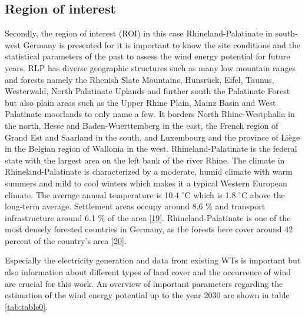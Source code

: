 \documentclass[a4paper,11pt]{article}
\begin{document}
\hypertarget{region-of-interest}{%
\subsection{Region of interest}\label{region-of-interest}}

Secondly, the region of interest (ROI) in this case Rhineland-Palatinate in south-west Germany is presented for it is important to know the site conditions and the statistical parameters of the past to assess the wind energy potential for future years. RLP has diverse geographic structures such as many low mountain ranges and forests namely the Rhenish Slate Mountains, Hunsrück, Eifel, Taunus, Westerwald, North Palatinate Uplands and further south the Palatinate Forest but also plain areas such as the Upper Rhine Plain, Mainz Basin and West Palatinate moorlands to only name a few. It borders North Rhine-Westphalia in the north, Hesse and Baden-Wuerttemberg in the east, the French region of Grand Est and Saarland in the south, and Luxembourg and the province of Liège in the Belgian region of Wallonia in the west. Rhineland-Palatinate is the federal state with the largest area on the left bank of the river Rhine. The climate in Rhineland-Palatinate is characterized by a moderate, humid climate with warm summers and mild to cool winters which makes it a typical Western European climate. The average annual temperature is 10.4 \(^\circ\)C which is 1.8 \(^\circ\)C above the long-term average. Settlement areas occupy around 8,6 \% and transport infrastructure around 6.1 \% of the area {[}\protect\hyperlink{ref-StateStatisticalOfficeofRhinelandPalatinate.2020}{19}{]}. Rhineland-Palatinate is one of the most densely forested countries in Germany, as the forests here cover around 42 percent of the country's area {[}\protect\hyperlink{ref-HansenandLamour.2021}{20}{]}.

Especially the electricity generation and data from existing WTs is important but also information about different types of land cover and the occurrence of wind are crucial for this work. An overview of important parameters regarding the estimation of the wind energy potential up to the year 2030 are shown in table \ref{tab:table0}.
\end{document}
